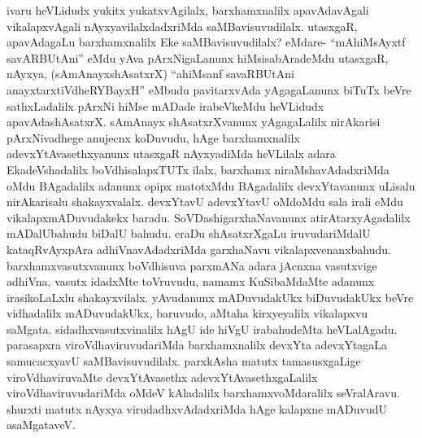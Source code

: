 \begin{artha}
ivaru heVLidudx yukitx yukatxvAgilalx, barxhamxnalilx apavAdavAgali vikalapxvAgali nAyxyavilalxdadxriMda saMBavisuvudilalx. utasxgaR, apavAdagaLu barxhamxnalilx Eke saMBavisuvudilalx? eMdare- ``mAhiMsAyxtf savARBUtAni'' eMdu yAva pArxNigaLanunx hiMsisabAradeMdu utasxgaR, nAyxya, (sAmAnayxshAsatxrX) ``ahiMsanf savaRBUtAni anayxtarxtiVdheRYBayxH'' eMbudu pavitarxvAda yAgagaLanunx biTuTx beVre sathxLadalilx pArxNi hiMse mADade irabeVkeMdu heVLidudx apavAdashAsatxrX. sAmAnayx shAsatxrXvanunx yAgagaLalilx nirAkarisi pArxNivadhege anujecnx koDuvudu, hAge barxhamxnalilx adevxYtAvasethxyanunx utasxgaR nAyxyadiMda heVLilalx adara EkadeVshadalilx boVdhisalapxTUTx ilalx, barxhamx niraMshavAdadxriMda oMdu BAgadalilx adanunx opipx matotxMdu BAgadalilx devxYtavanunx uLisalu nirAkarisalu shakayxvalalx. devxYtavU adevxYtavU oMdoMdu sala irali eMdu vikalapxmADuvudakekx baradu. SoVDashigarxhaNavanunx atirAtarxyAgadalilx mADalUbahudu biDalU bahudu. eraDu shAsatxrXgaLu iruvudariMdalU kataqRvAyxpAra adhiVnavAdadxriMda garxhaNavu vikalapxvenanxbahudu. barxhamxvasutxvanunx boVdhisuva parxmANa adara jAcnxna vasutxvige adhiVna, vasutx idadxMte toVruvudu, namamx KuSibaMdaMte adanunx irasikoLaLxlu shakayxvilalx. yAvudanunx mADuvudakUkx biDuvudakUkx beVre vidhadalilx mADuvudakUkx, baruvudo, aMtaha kirxyeyalilx vikalapxvu saMgata. sidadhxvasutxvinalilx hAgU ide hiVgU irabahudeMta heVLalAgadu. parasapxra viroVdhaviruvudariMda barxhamxnalilx devxYta adevxYtagaLa samucacxyavU saMBavisuvudilalx. parxkAsha matutx tamasusxgaLige viroVdhaviruvaMte devxYtAvasethx adevxYtAvasethxgaLalilx viroVdhaviruvudariMda oMdeV kAladalilx barxhamxvoMdaralilx seVralAravu. shurxti matutx nAyxya virudadhxvAdadxriMda hAge kalapxne mADuvudU asaMgataveV.
\end{artha}

